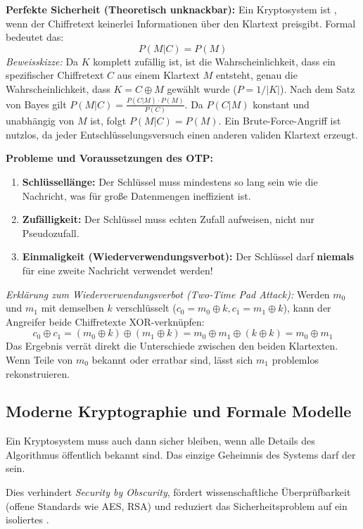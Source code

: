 \documentclass[
../../css_summary.tex,
]
{subfiles}
\begin{document}
\textbf{Perfekte Sicherheit (Theoretisch unknackbar):}
Ein Kryptosystem ist , wenn der Chiffretext keinerlei Informationen über den Klartext preisgibt. Formal bedeutet das: \[ P(M|C) = P(M) \]
\textit{Beweisskizze:} Da $K$ komplett zufällig ist, ist die Wahrscheinlichkeit, dass ein spezifischer Chiffretext $C$ aus einem Klartext $M$ entsteht, genau die Wahrscheinlichkeit, dass $K = C \oplus M$ gewählt wurde ($P = 1/|K|$). Nach dem Satz von Bayes gilt $P(M|C) = \frac{P(C|M) \cdot P(M)}{P(C)}$. Da $P(C|M)$ konstant und unabhängig von $M$ ist, folgt $P(M|C) = P(M)$. Ein Brute-Force-Angriff ist nutzlos, da jeder Entschlüsselungsversuch einen anderen validen Klartext erzeugt.

\textbf{Probleme und Voraussetzungen des OTP:}
\begin{enumerate}
   \item \textbf{Schlüssellänge:} Der Schlüssel muss mindestens so lang sein wie die Nachricht, was für große Datenmengen ineffizient ist.
   \item \textbf{Zufälligkeit:} Der Schlüssel muss echten Zufall aufweisen, nicht nur Pseudozufall.
   \item \textbf{Einmaligkeit (Wiederverwendungsverbot):} Der Schlüssel darf \textbf{niemals} für eine zweite Nachricht verwendet werden!
\end{enumerate}
\textit{Erklärung zum Wiederverwendungsverbot (Two-Time Pad Attack):}
Werden $m_0$ und $m_1$ mit demselben $k$ verschlüsselt ($c_0 = m_0 \oplus k, c_1 = m_1 \oplus k$), kann der Angreifer beide Chiffretexte XOR-verknüpfen:
\[ c_0 \oplus c_1 = (m_0 \oplus k) \oplus (m_1 \oplus k) = m_0 \oplus m_1 \oplus (k \oplus k) = m_0 \oplus m_1 \]
Das Ergebnis verrät direkt die Unterschiede zwischen den beiden Klartexten. Wenn Teile von $m_0$ bekannt oder erratbar sind, lässt sich $m_1$ problemlos rekonstruieren.

\subsection{Moderne Kryptographie und Formale Modelle}

\begin{defbox}
   Ein Kryptosystem muss auch dann sicher bleiben, wenn alle Details des Algorithmus öffentlich bekannt sind. Das einzige Geheimnis des Systems darf der  sein.
\end{defbox}
Dies verhindert \textit{Security by Obscurity}, fördert wissenschaftliche Überprüfbarkeit (offene Standards wie AES, RSA) und reduziert das Sicherheitsproblem auf ein isoliertes .
\end{document}
